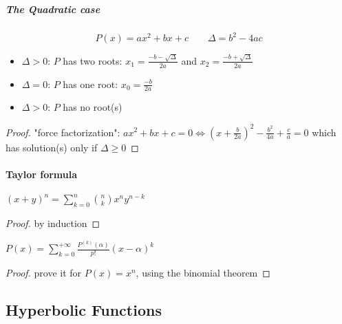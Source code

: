 \subparagraph{The Quadratic case}
$$P(x)=ax^2+bx+c \qquad \Delta=b^2-4ac$$
\begin{itemize}
	\item $\Delta>0$: $P$ has two roots: $x_1=\frac{-b-\sqrt{\Delta}}{2a}$ and $x_2=\frac{-b+\sqrt{\Delta}}{2a}$
	\item $\Delta=0$: $P$ has one root: $x_0=\frac{-b}{2a}$
	\item $\Delta>0$: $P$ has no root(s)
\end{itemize}
\begin{proof}
	"force factorization":
	$ax^2+bx+c=0
	\iff \left( x+\frac{b}{2a} \right)^2 -\frac{b^2}{4a} + \frac{c}{a} = 0$
	which has solution(s) only if $\Delta \geq 0$
\end{proof}

\paragraph{Taylor formula}
\begin{theorem}
	$(x+y)^n = \sum_{k=0}^n \binom{n}{k} x^ny^{n-k}$
\end{theorem}
\begin{proof}
	by induction
\end{proof}
\begin{theorem}
	$P(x) = \sum_{k=0}^{+\infty} \frac{P^{(k)}(\alpha)}{p!}(x-\alpha)^k$
\end{theorem}
\begin{proof}
	prove it for $P(x)=x^n$, using the binomial theorem
\end{proof}

\subsection{Hyperbolic Functions}
